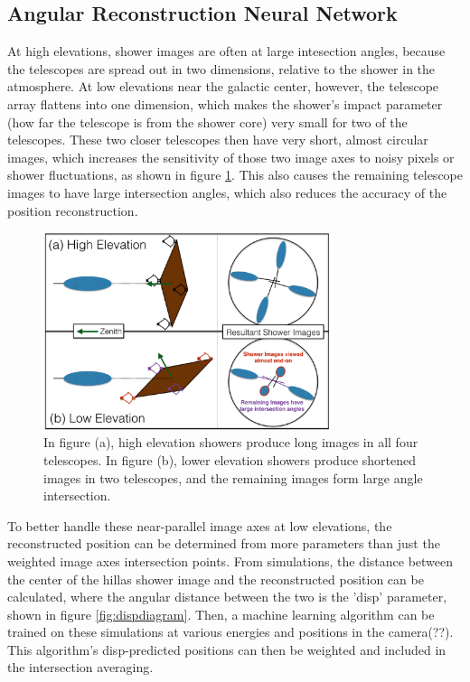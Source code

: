 \subsection{Angular Reconstruction Neural Network}\label{subsec:disp}
At high elevations, shower images are often at large intesection angles, because the telescopes are spread out in two dimensions, relative to the shower in the atmosphere.
At low elevations near the galactic center, however, the telescope array flattens into one dimension, which makes the shower's impact parameter (how far the telescope is from the shower core) very small for two of the telescopes.
These two closer telescopes then have very short, almost circular images, which increases the sensitivity of those two image axes to noisy pixels or shower fluctuations, as shown in figure \ref{fig:showerhighlowelev}.
This also causes the remaining telescope images to have large intersection angles, which also reduces the accuracy of the position reconstruction.

\begin{figure}[ht]
  \begin{center}
    \includegraphics[width=0.75\textwidth]{images/high_elevation_vs_low_shower_images_cropped.eps}
    \caption[Shower Images at High and Low Elevations]{In figure (a), high elevation showers produce long images in all four telescopes.  In figure (b), lower elevation showers produce shortened images in two telescopes, and the remaining images form large angle intersection.}\label{fig:showerhighlowelev}
  \end{center}
\end{figure}


To better handle these near-parallel image axes at low elevations, the reconstructed position can be determined from more parameters than just the weighted image axes intersection points.
From simulations, the distance between the center of the hillas shower image and the reconstructed position can be calculated, where the angular distance between the two is the 'disp' parameter\cite{Senturk:2011}, shown in figure \ref{fig:dispdiagram}.
Then, a machine learning algorithm \cite{Beilicke2012NIM} can be trained on these simulations at various energies and positions in the camera(??).
This algorithm's disp-predicted positions can then be weighted and included in the intersection averaging.

